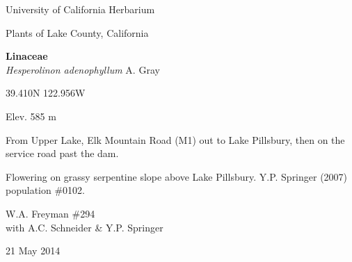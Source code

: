\documentclass[letterpaper,10pt]{article}
\begin{document}
\begin{minipage}[t]{0.40\textwidth}

\begin{center}
University of California Herbarium \\
\begin{large}
Plants of Lake County, California \\
\end{large}
\vspace{\baselineskip}
\textbf{Linaceae} \\
\textit{Hesperolinon adenophyllum} A. Gray\\
\end{center}

\begin{footnotesize}

\begin{multicols}{2}
39.410\textdegree N 122.956\textdegree W
\columnbreak
\begin{flushright}
Elev. 585 m
\end{flushright}
\end{multicols}

From Upper Lake, Elk Mountain Road (M1) out to Lake Pillsbury, then on the service road past the dam.
\vspace{\baselineskip}

Flowering on grassy serpentine slope above Lake Pillsbury. Y.P. Springer (2007) population \#0102.

\begin{multicols}{2}
W.A. Freyman \#294 \\
with A.C. Schneider \& Y.P. Springer
\columnbreak
\begin{flushright}
21 May 2014
\end{flushright}
\end{multicols}

\end{footnotesize}

\end{minipage}
%
\hspace{2cm}
%
\end{document}
